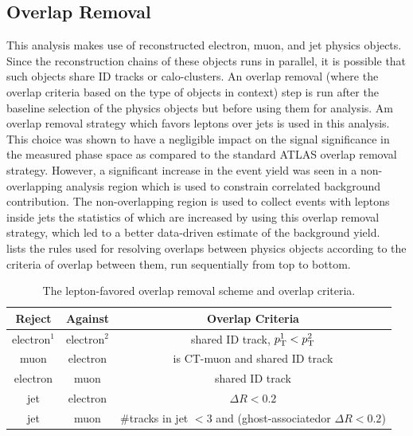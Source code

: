 \subsection{Overlap Removal}
This analysis makes use of reconstructed electron, muon, and jet physics objects. Since the reconstruction chains of these objects runs in parallel, it is possible that such objects share ID tracks or calo-clusters. An overlap removal (where the overlap criteria based on the type of objects in context) step is run after the baseline selection of the physics objects but before using them for analysis. Am overlap removal strategy which favors leptons over jets is used in this analysis. This choice was shown to have a negligible impact on the signal significance in the measured phase space as compared to the standard ATLAS overlap removal strategy. However, a significant increase in the event yield was seen in a non-overlapping analysis region which is used to constrain correlated background contribution. The non-overlapping region is used to collect events with leptons inside jets the statistics of which are increased by using this overlap removal strategy, which led to a better data-driven estimate of the background yield.~ lists the rules used for resolving overlaps between physics objects according to the criteria of overlap between them, run sequentially from top to bottom.

\begin{table}[!ht]
    \centering\small
    \begin{tabular}{ccc}
        \hline\hline
        Reject & Against & Overlap Criteria \\
        \hline
        electron$^1$ & electron$^2$ & shared ID track, $p_\mathrm{T}^1 < p_\mathrm{T}^2$ \\
        muon & electron & is CT-muon and shared ID track \\
        electron & muon & shared ID track \\
        jet & electron & $\Delta R<0.2$ \\
        jet & muon & \#tracks in jet $<$3 and (ghost-associated\footnotemark or $\Delta R<0.2$) \\
        \hline\hline
    \end{tabular}
    \caption{The lepton-favored overlap removal scheme and overlap criteria.}
    \label{tab:overlap_removal}
\end{table}

